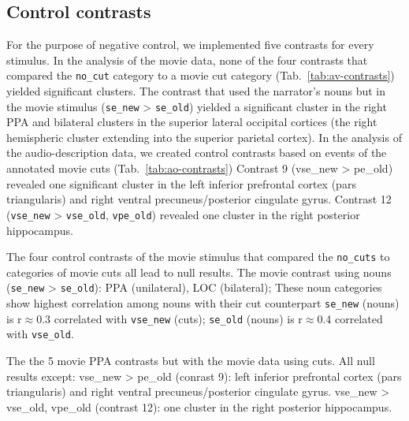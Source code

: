 \documentclass[english]{article}
\begin{document}


\subsection{Control contrasts}




For the purpose of negative control, we implemented five contrasts for every
stimulus.
In the analysis of the movie data, none of the four contrasts that compared the
\texttt{no\_cut} category to a movie cut category (Tab.~\ref{tab:av-contrasts})
yielded significant clusters.
The contrast that used the narrator's nouns but in the movie stimulus
(\texttt{se\_new} > \texttt{se\_old}) yielded a significant cluster in the right
PPA and bilateral clusters in the superior lateral occipital cortices (the right
hemispheric cluster extending into the superior parietal cortex).
In the analysis of the audio-description data, we created control contrasts based on events of
the annotated movie cuts (Tab.~\ref{tab:ao-contrasts})
Contrast 9 (vse\_new > pe\_old) revealed one significant cluster in the left
inferior prefrontal cortex (pars triangularis) and right ventral
precuneus/posterior cingulate gyrus.
Contrast 12 (\texttt{vse\_new} > \texttt{vse\_old}, \texttt{vpe\_old}) revealed
one cluster in the right posterior hippocampus.



The four control contrasts of the movie stimulus that compared the
\texttt{no\_cuts} to categories of movie cuts all lead to null results.
The movie contrast using nouns (\texttt{se\_new} > \texttt{se\_old}): PPA
(unilateral), LOC (bilateral); These noun categories show highest correlation
among nouns with their cut counterpart \texttt{se\_new} (nouns) is r$\approx$0.3
correlated with \texttt{vse\_new} (cuts); \texttt{se\_old} (nouns) is
r$\approx$0.4 correlated with \texttt{vse\_old}.

The the 5 movie PPA contrasts but with the movie data using cuts. All null results
except:
vse\_new > pe\_old (conrast 9): left inferior prefrontal cortex (pars
triangularis) and right ventral precuneus/posterior cingulate gyrus.
vse\_new > vse\_old, vpe\_old (contrast 12): one cluster in the right posterior
hippocampus.
\end{document}
